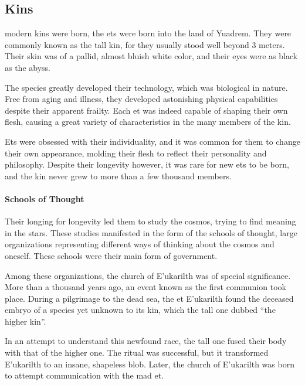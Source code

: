 \begin{linenumbers}

\chapter{Kins}
modern kins were born, the ets were born into the land of Yuadrem.
They were commonly known as the tall kin, for they usually stood well beyond 3 meters.
Their skin was of a pallid, almost bluish white color, and their eyes were as black as the abyss.

The species greatly developed their technology, which was biological in nature.
Free from aging and illness, they developed astonishing physical capabilities despite their apparent frailty.
Each et was indeed capable of shaping their own flesh, causing a great variety of characteristics in the many members of the kin.

Ets were obsessed with their individuality, and it was common for them to change their own appearance, molding their flesh to reflect their personality and philosophy.
Despite their longevity however, it was rare for new ets to be born, and the kin never grew to more than a few thousand members.

\subsubsection{Schools of Thought}
Their longing for longevity led them to study the cosmos, trying to find meaning in the stars.
These studies manifested in the form of the schools of thought, large organizations representing different ways of thinking about the cosmos and oneself.
These schools were their main form of government.%

Among these organizations, the church of E'ukarilth was of special significance.
More than a thousand years ago, an event known as the first communion took place.
During a pilgrimage to the dead sea, the et E'ukarilth found the deceased embryo of a species yet unknown to its kin, which the tall one dubbed ``the higher kin''.

In an attempt to understand this newfound race, the tall one fused their body with that of the higher one.
The ritual was successful, but it transformed E'ukarilth to an insane, shapeless blob.
Later, the church of E'ukarilth was born to attempt communication with the mad et.


\end{linenumbers}
